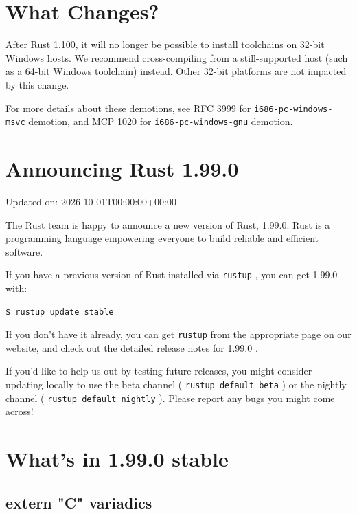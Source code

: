 \documentclass[11pt,a4paper]{article}
\begin{document}
\section{What Changes?}

After Rust 1.100, it will no longer be possible to install toolchains on 32-bit Windows hosts. We recommend cross-compiling from a still-supported host (such as a 64-bit Windows toolchain) instead. Other 32-bit platforms are not impacted by this change.

For more details about these demotions, see \href{https://github.com/rust-lang/rfcs/blob/51783df9a76c355de7ceebeae101cba47f8ca463/text/3999-std-only-i686-msvc.md}{RFC 3999} for \texttt{i686-pc-windows-msvc} demotion, and \href{https://github.com/rust-lang/compiler-team/issues/1020}{MCP 1020} for \texttt{i686-pc-windows-gnu} demotion.

\section{Announcing Rust 1.99.0}

Updated on: 2026-10-01T00:00:00+00:00

The Rust team is happy to announce a new version of Rust, 1.99.0. Rust is a programming language empowering everyone to build reliable and efficient software.

If you have a previous version of Rust installed via \texttt{rustup} , you can get 1.99.0 with:

\begin{verbatim}
$ rustup update stable
\end{verbatim}

If you don't have it already, you can get \texttt{rustup} from the appropriate page on our website, and check out the \href{https://doc.rust-lang.org/stable/releases.html\#version-1990-2026-10-01}{detailed release notes for 1.99.0} .

If you'd like to help us out by testing future releases, you might consider updating locally to use the beta channel ( \texttt{rustup default beta} ) or the nightly channel ( \texttt{rustup default nightly} ). Please \href{https://github.com/rust-lang/rust/issues/new/choose}{report} any bugs you might come across!

\section{What's in 1.99.0 stable}

\subsection{extern "C" variadics}
\end{document}
